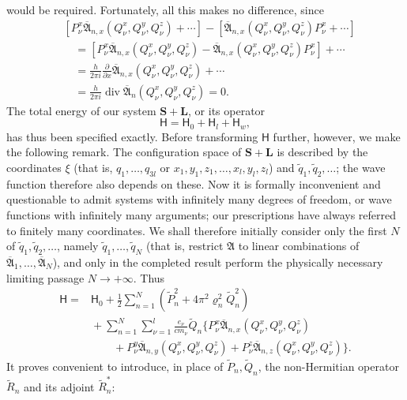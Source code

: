 \documentclass[fontsize=13pt,twoside,openany,headings=normal,parskip=false,bookmarkpackage=false,DIV=calc]{scrbook}
\begin{document}
would be required. Fortunately, all this makes no difference, since
\begin{align*}
 &[P_\nu^x\overline{\mathfrak A}_{n,x}(Q_\nu^x,Q_\nu^y,Q_\nu^z)+\cdots]
 -[\overline{\mathfrak A}_{n,x}(Q_\nu^x,Q_\nu^y,Q_\nu^z)P_\nu^x+\cdots]\\
 &\quad=[P_\nu^x\overline{\mathfrak A}_{n,x}(Q_\nu^x,Q_\nu^y,Q_\nu^z)
 -\overline{\mathfrak A}_{n,x}(Q_\nu^x,Q_\nu^y,Q_\nu^z)P_\nu^x]+\cdots\\
 &\quad=\frac{h}{2\pi i}\frac{\partial}{\partial x}
 \overline{\mathfrak A}_{n,x}(Q_\nu^x,Q_\nu^y,Q_\nu^z)+\cdots\\
 &\quad=\frac{h}{2\pi i}\operatorname{div}\overline{\mathfrak A}_n(Q_\nu^x,Q_\nu^y,Q_\nu^z)=0.
\end{align*}
\hypertarget{origpage-141}{}%
The total energy of our system $\boldsymbol{S}+\boldsymbol{L}$, or its operator
\[
 \mathsf{H}=\mathsf{H}_0+\mathsf{H}_l+\mathsf{H}_w,
\]
has thus been specified exactly. Before transforming $\mathsf{H}$ further, however, we make the following remark. The configuration space of $\boldsymbol{S}+\boldsymbol{L}$ is described by the coordinates $\xi$ (that is, $q_1,\ldots,q_{3l}$ or $x_1,y_1,z_1,\ldots,x_l,y_l,z_l$) and $\widetilde q_1,\widetilde q_2,\ldots$; the wave function therefore also depends on these. Now it is formally inconvenient and questionable to admit systems with infinitely many degrees of freedom, or wave functions with infinitely many arguments; our prescriptions have always referred to finitely many coordinates. We shall therefore initially consider only the first $N$ of $\widetilde q_1,\widetilde q_2,\ldots$, namely $\widetilde q_1,\ldots,\widetilde q_N$ (that is, restrict $\mathfrak A$ to linear combinations of $\overline{\mathfrak A}_1,\ldots,\overline{\mathfrak A}_N$), and only in the completed result perform the physically necessary limiting passage $N\longrightarrow+\infty$. Thus
\begin{align*}
 \mathsf{H}={}&\mathsf{H}_0+\tfrac12\sum_{n=1}^{N}
 (\widetilde P_n^2+4\pi^2\varrho_n^2\widetilde Q_n^2)\\
 &{}+\sum_{n=1}^{N}\sum_{\nu=1}^{l}\frac{e_\nu}{cm_\nu}\widetilde Q_n
 \bigl\{P_\nu^x\overline{\mathfrak A}_{n,x}(Q_\nu^x,Q_\nu^y,Q_\nu^z)\\
 &\qquad{}+P_\nu^y\overline{\mathfrak A}_{n,y}(Q_\nu^x,Q_\nu^y,Q_\nu^z)
 +P_\nu^z\overline{\mathfrak A}_{n,z}(Q_\nu^x,Q_\nu^y,Q_\nu^z)\bigr\}.
\end{align*}
It proves convenient to introduce, in place of $\widetilde P_n,\widetilde Q_n$, the non-Hermitian operator $\widetilde R_n$ and its adjoint $\widetilde R_n^*$:
\end{document}
